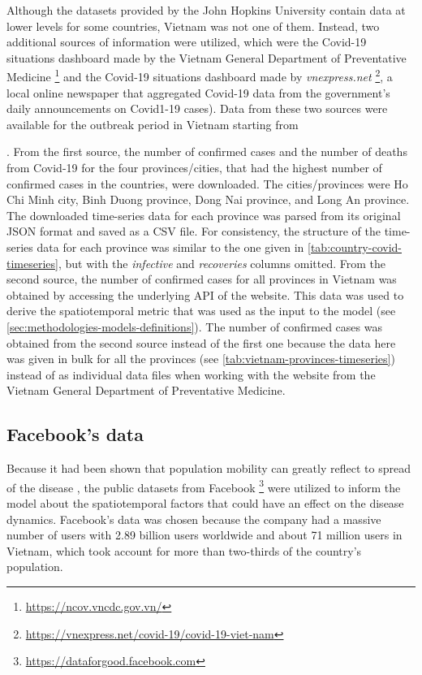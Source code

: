 Although the datasets provided by the John Hopkins University contain data at lower levels for some countries, Vietnam was not one of them.
Instead, two additional sources of information were utilized, which were the Covid-19 situations dashboard made by the Vietnam General Department of Preventative Medicine \footnote{\url{https://ncov.vncdc.gov.vn/}} and the Covid-19 situations dashboard made by \textit{vnexpress.net} \footnote{\url{https://vnexpress.net/covid-19/covid-19-viet-nam}}, a local online newspaper that aggregated Covid-19 data from the government's daily announcements on Covid1-19 cases).
Data from these two sources were available for the outbreak period in Vietnam starting from \date{27th April 2021}.
From the first source, the number of confirmed cases and the number of deaths from Covid-19 for the four provinces/cities, that had the highest number of confirmed cases in the countries, were downloaded.
The cities/provinces were Ho Chi Minh city, Binh Duong province, Dong Nai province, and Long An province.
The downloaded time-series data for each province was parsed from its original \gls{JSON} format and saved as a \gls{CSV} file.
For consistency, the structure of the time-series data for each province was similar to the one given in \autoref{tab:country-covid-timeseries}, but with the \textit{infective} and \textit{recoveries} columns omitted.
From the second source, the number of confirmed cases for all provinces in Vietnam was obtained by accessing the underlying \gls{API} of the website.
This data was used to derive the spatiotemporal metric that was used as the input to the model (see \autoref{sec:methodologies-models-definitions}).
The number of confirmed cases was obtained from the second source instead of the first one because the data here was given in bulk for all the provinces (see \autoref{tab:vietnam-provinces-timeseries}) instead of as individual data files when working with the website from the Vietnam General Department of Preventative Medicine.

\subsection{Facebook's data}
\label{sec:methodologies-data-mobility-data}

Because it had been shown that population mobility can greatly reflect to spread of the disease \cite{changMobilityNetworkModels2021,liSubstantialUndocumentedInfection2020,ihmecovid-19forecastingteamModelingCOVID19Scenarios2021}, the public datasets from Facebook \footnote{\url{https://dataforgood.facebook.com}} were utilized to inform the model about the spatiotemporal factors that could have an effect on the disease dynamics.
Facebook's data was chosen because the company had a massive number of users with 2.89 billion users worldwide and about 71 million users in Vietnam, which took account for more than two-thirds of the country's population.


